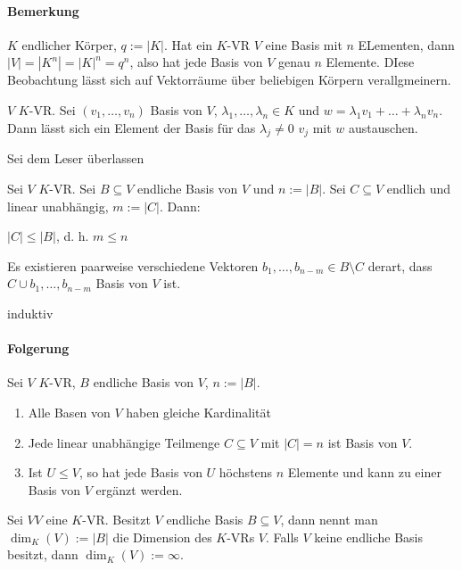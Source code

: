 \paragraph{Bemerkung} $K$ endlicher Körper, $q:=|K|$. Hat ein $K$-VR $V$ eine Basis mit $n$ ELementen, dann  $|V|=|K^n|=|K|^n=q^n$, also hat jede Basis von $V$ genau $n$ Elemente. DIese Beobachtung lässt sich auf Vektorräume über beliebigen Körpern verallgmeinern.
\begin{lemma}[Austauschlemma]
	$V$ $K$-VR. Sei $(v_1,\dots,v_n)$ Basis von $V$, $\lambda_1, \dots, \lambda_n \in K$ und $w=\lambda_1v_1+\dots+\lambda_nv_n$. Dann lässt sich ein Element der Basis für das $\lambda_j\neq 0$ $v_j$ mit $w$ austauschen.
\end{lemma}
\prove Sei dem Leser überlassen
\begin{theorem}
	Sei $V$ $K$-VR. Sei $B\subseteq V$ endliche Basis von $V$ und $n:=|B|$. Sei $C\subseteq V$ endlich und linear unabhängig, $m:=|C|$. Dann:
	\begin{enumerateroman}
	\item $|C|\leq |B|$, d. h. $m\leq n$
	\item Es existieren paarweise verschiedene Vektoren $b_1, \dots, b_{n-m}\in B\setminus C$ derart, dass $C \cup {b_1, \dots, b_{n-m}}$ Basis von $V$ ist.
	\end{enumerateroman}
\end{theorem}
\prove induktiv 
\paragraph{Folgerung} Sei $V$ $K$-VR, $B$ endliche Basis von $V$, $n:=|B|$.\begin{enumerate}
	\item Alle Basen von $V$ haben gleiche Kardinalität
	\item Jede linear unabhängige Teilmenge $C\subseteq V$ mit $|C|=n$ ist Basis von $V$.
	\item Ist $U\leq V$, so hat jede Basis von $U$ höchstens $n$ Elemente und kann zu einer Basis von $V$ ergänzt werden.
\end{enumerate}
\begin{definition}
		Sei $VV$ eine $K$-VR. Besitzt $V$ endliche Basis $B\subseteq V$, dann nennt man $\dim_K(V):=|B|$ die Dimension des $K$-VRs $V$. Falls $V$ keine endliche Basis besitzt, dann $\dim_K(V):=\infty$.
\end{definition}
